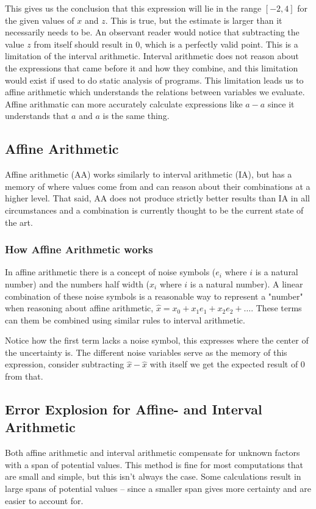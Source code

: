 \documentclass[msc,lith,english]{liuthesis}
\begin{document}
This gives us the conclusion that this expression will lie in the range $[-2, 4]$ for the given values of $x$ and $z$. This is true, but the estimate is larger than it necessarily needs to be. An observant reader would notice that subtracting the value $z$ from itself should result in $0$, which is a perfectly valid point. This is a limitation of the interval arithmetic. Interval arithmetic does not reason about the expressions that came before it and how they combine, and this limitation would exist if used to do static analysis of programs. This limitation leads us to affine arithmetic which understands the relations between variables we evaluate. Affine arithmatic can more accurately calculate expressions like $a - a$ since it understands that $a$ and $a$ is the same thing.


\subsection{Affine Arithmetic}
Affine arithmetic (AA) works similarly to interval arithmetic (IA), but has a memory of where values come from and can reason about their combinations at a higher level. That said, AA does not produce strictly better results than IA in all circumstances and a combination is currently thought to be the current state of the art. 

\subsubsection{How Affine Arithmetic works}
In affine arithmetic there is a concept of noise symbols ($e_i$ where $i$ is a natural number) and the numbers half width ($x_i$ where $i$ is a natural number). A linear combination of these noise symbols is a reasonable way to represent a "number" when reasoning about affine arithmetic, $\hat{x} = x_0 + x_1e_1 + x_2e_2 + \dots$. These terms can them be combined using similar rules to interval arithmetic.

Notice how the first term lacks a noise symbol, this expresses where the center of the uncertainty is. The different noise variables serve as the memory of this expression, consider subtracting $\hat{x} - \hat{x}$ with itself we get the expected result of 0 from that.

\subsection{Error Explosion for Affine- and Interval Arithmetic}
Both affine arithmetic and interval arithmetic compensate for unknown factors with a span of potential values. This method is fine for most computations that are small and simple, but this isn't always the case. Some calculations result in large spans of potential values -- since a smaller span gives more certainty and are easier to account for.
\end{document}
